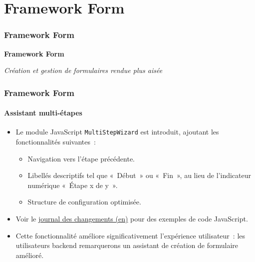 %

\section{Framework Form}
\begin{frame}[fragile]
	\frametitle{Framework Form}

	\begin{center}\huge{\color{typo3darkgrey}\textbf{Framework Form}}\end{center}
	\begin{center}\large{\textit{Création et gestion de formulaires rendue plus aisée}}\end{center}

\end{frame}


\begin{frame}[fragile]
	\frametitle{Framework Form}
	\framesubtitle{Assistant multi-étapes}

	\begin{itemize}
		\item Le module JavaScript \texttt{MultiStepWizard} est introduit,
			ajoutant les fonctionnalités suivantes~:

			\begin{itemize}
				\item Navigation vers l'étape précédente.
				\item Libellés descriptifs tel que «~Début~» ou «~Fin~», au lieu de l'indicateur numérique «~Étape x de y~».
				\item Structure de configuration optimisée.
			\end{itemize}

		\item Voir le \href{https://docs.typo3.org/c/typo3/cms-core/master/en-us/Changelog/10.2/Feature-79445-AddMultistepWizard.html}{journal des changements (en)}
			pour des exemples de code JavaScript.

		\item Cette fonctionnalité améliore significativement l'expérience utilisateur~: les utilisateurs backend remarquerons
			un assistant de création de formulaire amélioré.

	\end{itemize}

\end{frame}

